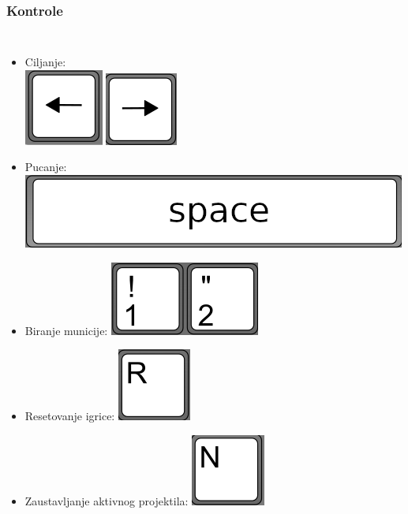 \documentclass{beamer}
\begin{document}
\begin{frame}
	\frametitle{Kontrole}
	
	\begin{columns}
		\begin{itemize}
			\item Ciljanje:
			\\
			\includegraphics[scale=0.7]{./images/levo.png}
			\includegraphics[scale=0.73]{./images/desno.png}
			\item Pucanje:
			\includegraphics[scale=0.7]{./images/space.png}
			\item Biranje municije:
			\includegraphics[scale=0.7]{./images/12.png}
			\item Resetovanje igrice:
			\includegraphics[scale=0.7]{./images/r.png}
			\item Zaustavljanje aktivnog projektila:
			\includegraphics[scale=0.7]{./images/n.png}

\end{itemize}
\end{columns}
\end{frame}
\end{document}
